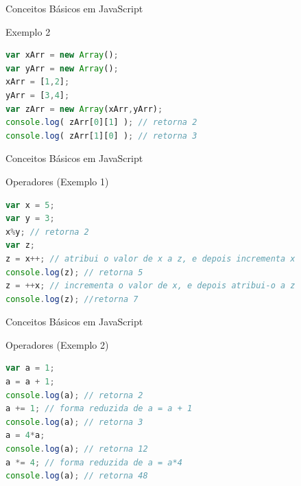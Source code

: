 \documentclass[xcolor=dvipsnames,table]{beamer}
\begin{document}
\begin{frame}[fragile]{Conceitos Básicos em JavaScript}
	\begin{block}{Exemplo 2}
		\begin{lstlisting}[language=JavaScript]
var xArr = new Array();
var yArr = new Array();
xArr = [1,2];
yArr = [3,4];
var zArr = new Array(xArr,yArr);
console.log( zArr[0][1] ); // retorna 2
console.log( zArr[1][0] ); // retorna 3
\end{lstlisting}	
	\end{block}
\end{frame}

\begin{frame}[fragile]{Conceitos Básicos em JavaScript}
	\begin{block}{Operadores (Exemplo 1)}
		\begin{lstlisting}[language=JavaScript]
var x = 5;
var y = 3;
x%y; // retorna 2
var z;
z = x++; // atribui o valor de x a z, e depois incrementa x
console.log(z); // retorna 5
z = ++x; // incrementa o valor de x, e depois atribui-o a z
console.log(z); //retorna 7
\end{lstlisting}	
	\end{block}
\end{frame}

\begin{frame}[fragile]{Conceitos Básicos em JavaScript}
	\begin{block}{Operadores (Exemplo 2)}
		\begin{lstlisting}[language=JavaScript]
var a = 1;
a = a + 1;
console.log(a); // retorna 2
a += 1; // forma reduzida de a = a + 1
console.log(a); // retorna 3
a = 4*a;
console.log(a); // retorna 12
a *= 4; // forma reduzida de a = a*4
console.log(a); // retorna 48
\end{lstlisting}	
	\end{block}
\end{frame}
\end{document}
